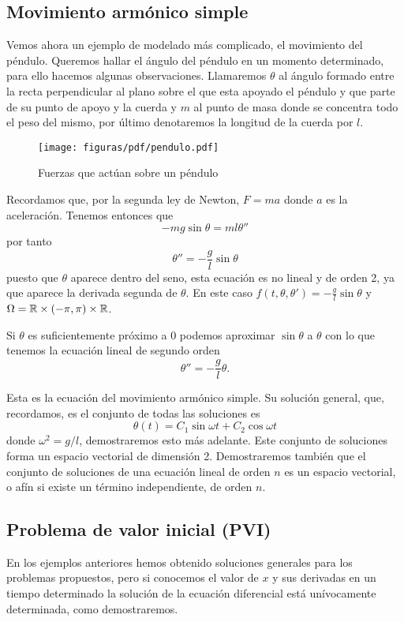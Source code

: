 \documentclass[../ecuaciones_diferenciales.tex]{subfiles}
\begin{document}
\subsection{Movimiento armónico simple} 

Vemos ahora un ejemplo de modelado más complicado, el movimiento del péndulo.
Queremos hallar el ángulo del péndulo en un momento determinado, para ello
hacemos algunas observaciones. Llamaremos \(\theta\) al ángulo
formado entre la recta perpendicular al plano sobre el que esta apoyado el
péndulo y que parte de su punto de apoyo y la cuerda y \(m\) al punto de masa
donde se concentra todo el peso del mismo, por último denotaremos la longitud
de la cuerda por \(l\). 

\begin{figure}[ht]
	\centering
	\texttt{[image: figuras/pdf/pendulo.pdf]}
	\caption{Fuerzas que actúan sobre un péndulo}
	\label{fig:pendulo}
\end{figure}

Recordamos que, por la segunda ley de Newton, \(F = ma\) donde \(a\) es la 
aceleración. Tenemos entonces que
\[-m g \sin\theta = m l \theta''\]
por tanto
\[\theta'' = -\frac{g}{l} \sin\theta\]
puesto que \(\theta\) aparece dentro del seno, esta ecuación es no lineal y de
orden 2, ya que aparece la derivada segunda de \(\theta\). En este caso
\(f(t, \theta, \theta') = -\frac{g}{l} \sin\theta\) y \(\Omega = \mathbb{R} \times
(-\pi, \pi) \times \mathbb{R}\). 

Si \(\theta\) es suficientemente próximo a \(0\) podemos aproximar 
\(\sin\theta\) a \(\theta\) con lo que tenemos la ecuación
lineal de segundo orden
\[\theta'' = -\frac{g}{l}\theta.\]

Esta es la ecuación del movimiento armónico simple. Su solución general, que,
recordamos, es el conjunto de todas las soluciones es
\[\theta(t) = C_1 \sin \omega t + C_2 \cos \omega t\]
donde \(\omega^2 = g/l\), demostraremos esto más adelante. Este conjunto de
soluciones forma un espacio vectorial de dimensión 2. Demostraremos también que
el conjunto de soluciones de una ecuación lineal de orden \(n\) es un espacio
vectorial, o afín si existe un término independiente, de orden \(n\).

\subsection{Problema de valor inicial (PVI)}

En los ejemplos anteriores hemos obtenido soluciones generales para los
problemas propuestos, pero si conocemos el valor de \(x\) y sus derivadas en un
tiempo determinado la solución de la ecuación diferencial está
unívocamente determinada, como demostraremos.
\end{document}
